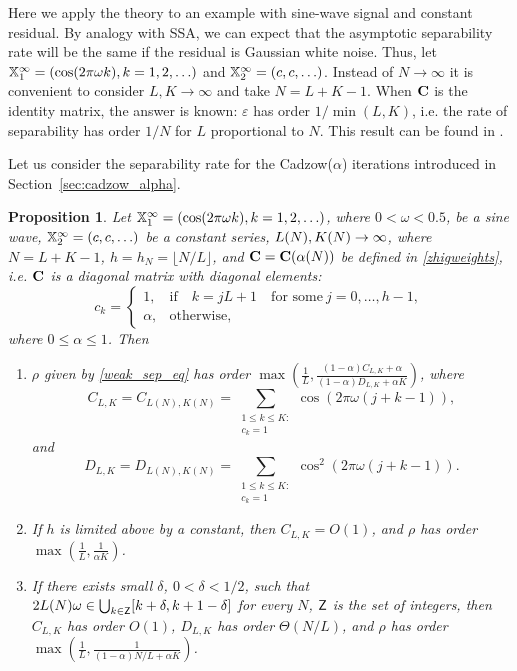 \documentclass[sii]{ipart}
\newtheorem{proposition}{Proposition}
\begin{document}
Here we apply the theory to an example with sine-wave signal and constant residual. By analogy with SSA, we can expect that the asymptotic separability rate will be the same if the residual is Gaussian white noise.
Thus, let
$\mathbb{X}_1^\infty = (\cos(2 \pi \omega k), k = 1, 2, \ldots)$ and  $\mathbb{X}_2^\infty = (c, c, \ldots)$. Instead of $N \to \infty$ it is convenient to consider $L,K \to \infty$ and take $N = L + K - 1$. When $\mathbf{C}$ is the identity matrix, the answer is known: $\varepsilon$ has order $1/\min(L,K)$, i.e. the rate of separability has order $1/N$ for $L$ proportional to $N$.
This result can be found in \cite[Chapter 6.1]{Golyandina.etal2001}.

\smallskip
Let us consider the separability rate for the Cadzow($\alpha$) iterations introduced in Section~\ref{sec:cadzow_alpha}.

\begin{proposition}
	\label{prop:separ1}
	Let $\mathbb{X}_1^\infty = (\cos(2 \pi \omega k), k = 1, 2, \ldots)$, where $0<\omega <0.5$, be a sine wave, $\mathbb{X}_2^\infty = (c, c, \ldots)$ be a constant series,  $L(N),K(N)\rightarrow \infty$, where $N=L+K-1$, $h = h_N = \lfloor N/L \rfloor$, and $\mathbf{C}=\mathbf{C}(\alpha(N))$ be defined in \eqref{zhigweights}, i.e.  $\mathbf{C}$ is a diagonal matrix with diagonal elements:
	\begin{equation*}
	c_k = \begin{cases}
	1, & \text{if} \quad k = jL+1 \quad \text{for some} \ j = 0, \ldots, h-1,\\
	\alpha, & \text{otherwise},
	\end{cases}
	\end{equation*}
	where $0 \le \alpha \le 1$. Then
	\begin{enumerate}
		\item $\rho$ given by \eqref{weak_sep_eq} has order $\max\left(\frac{1}{L}, \frac{(1-\alpha)C_{L,K}+\alpha}{(1-\alpha)D_{L,K}+\alpha K}\right)$, where
		\begin{equation*}
		C_{L,K} = C_{L(N),K(N)} = \sum_{\substack{1 \le k \le K: \\ c_k = 1}}\cos(2 \pi \omega (j + k - 1)),
		\end{equation*} and
		\begin{equation*}
		D_{L,K} = D_{L(N),K(N)} = \sum_{\substack{1 \le k \le K: \\ c_k = 1}}\cos^2(2 \pi \omega (j + k - 1)).
		\end{equation*}
		\item If $h$ is limited above by a constant, then $C_{L,K} = O(1)$, and $\rho$ has order $\max\left(\frac{1}{L}, \frac{1}{\alpha K}\right)$.
		\item If there exists small $\delta$, $0 < \delta < 1/2$, such that $2 L(N) \omega \in \bigcup_{k \in \mathsf{Z}} [k + \delta, k + 1 - \delta]$ for every $N$, $\mathsf{Z}$ is the set of integers, then $C_{L, K}$ has order $O(1)$, $D_{L, K}$ has order $\Theta(N/L)$, and $\rho$ has order $\max\left(\frac{1}{L}, \frac{1}{(1-\alpha)N/L+\alpha K}\right)$.
	\end{enumerate}
	
\end{proposition}
\end{document}

